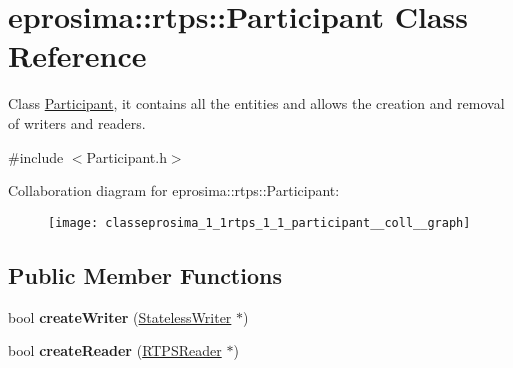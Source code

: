 \hypertarget{classeprosima_1_1rtps_1_1_participant}{\section{eprosima\-:\-:rtps\-:\-:\-Participant \-Class \-Reference}
\label{classeprosima_1_1rtps_1_1_participant}
}


\-Class \hyperlink{classeprosima_1_1rtps_1_1_participant}{\-Participant}, it contains all the entities and allows the creation and removal of writers and readers.  




{\ttfamily \#include $<$\-Participant.\-h$>$}



\-Collaboration diagram for eprosima\-:\-:rtps\-:\-:\-Participant\-:\nopagebreak
\begin{figure}[H]
\begin{center}
\leavevmode
\texttt{[image: classeprosima\_1\_1rtps\_1\_1\_participant\_\_coll\_\_graph]}
\end{center}
\end{figure}
\subsection*{\-Public \-Member \-Functions}
\begin{DoxyCompactItemize}
\item 
\hypertarget{classeprosima_1_1rtps_1_1_participant_aa5a56cbf715abfef4dd089e54042d33c}{bool {\bfseries create\-Writer} (\hyperlink{classeprosima_1_1rtps_1_1_stateless_writer}{\-Stateless\-Writer} $\ast$)}\label{classeprosima_1_1rtps_1_1_participant_aa5a56cbf715abfef4dd089e54042d33c}

\item 
\hypertarget{classeprosima_1_1rtps_1_1_participant_af2b6a65e4fd6096edde9ab514c15967d}{bool {\bfseries create\-Reader} (\hyperlink{classeprosima_1_1rtps_1_1_r_t_p_s_reader}{\-R\-T\-P\-S\-Reader} $\ast$)}\label{classeprosima_1_1rtps_1_1_participant_af2b6a65e4fd6096edde9ab514c15967d}

\end{DoxyCompactItemize}
